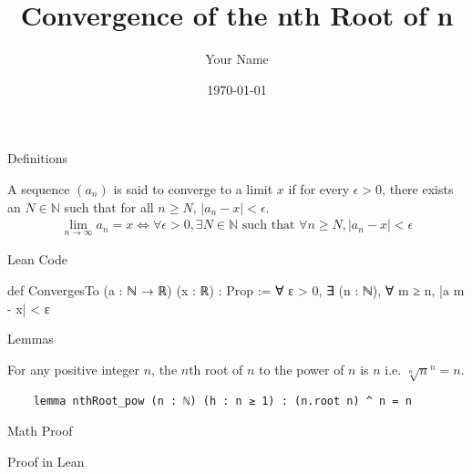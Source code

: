 \documentclass{beamer}
\title{Convergence of the nth Root of n}
\author{Your Name}
\date{\today}
\begin{document}
\begin{frame}
    \titlepage
\end{frame}

\begin{frame}[fragile]{Definitions}
    \begin{definition}
        A sequence $(a_n)$ is said to converge to a limit $x$ if for every $\epsilon > 0$, there exists an $N \in \mathbb{N}$ such that for all $n \geq N$, $|a_n - x| < \epsilon$.
        \begin {align*}
            \lim_{n \to \infty} a_n = x \iff \forall \epsilon > 0, \exists N \in \mathbb{N} \text{ such that } \forall n \geq N, |a_n - x| < \epsilon
        \end {align*}
    \end{definition}
    
    \begin{block}{Lean Code}
    \begin{leancode}
        def ConvergesTo (a : ℕ → ℝ) (x : ℝ) : Prop := 
            ∀ ε > 0, ∃ (n : ℕ), ∀ m ≥ n, |a m - x| < ε
    \end{leancode}
    \end{block}

\end{frame}

\begin{frame}[fragile]{Lemmas}
    \begin{lemma}
        For any positive integer $n$, the $n$th root of $n$ to the power of $n$ is $n$ i.e. $\sqrt[n]{n}^n = n$.
    \end{lemma}

    \begin{lemma}
    \begin{lstlisting}
    lemma nthRoot_pow (n : ℕ) (h : n ≥ 1) : (n.root n) ^ n = n
    \end{lstlisting}
    \end{lemma}
\end{frame}

\begin{frame}{Math Proof}
\end{frame}

\begin{frame}{Proof in Lean}
\end{frame}
\end{document}
